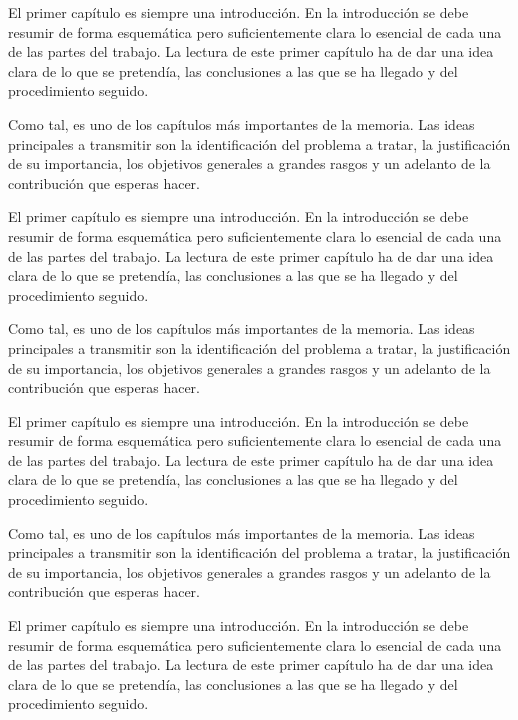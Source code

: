 \documentclass[11pt,a4paper,spanish]{book}
\numberwithin{equation}{chapter}
\numberwithin{figure}{chapter}
\begin{document}
El primer capítulo es siempre una introducción. En la introducción se debe resumir de forma esquemática pero suficientemente clara lo esencial de cada una de las partes del trabajo. La lectura de este primer capítulo ha de dar una idea clara de lo que se pretendía, las conclusiones a las que se ha llegado y del procedimiento seguido.

Como tal, es uno de los capítulos más importantes de la memoria. Las ideas principales a transmitir son la identificación del problema a tratar, la justificación de su importancia, los objetivos generales a grandes rasgos y un adelanto de la contribución que esperas hacer.






El primer capítulo es siempre una introducción. En la introducción se debe resumir de forma esquemática pero suficientemente clara lo esencial de cada una de las partes del trabajo. La lectura de este primer capítulo ha de dar una idea clara de lo que se pretendía, las conclusiones a las que se ha llegado y del procedimiento seguido.

Como tal, es uno de los capítulos más importantes de la memoria. Las ideas principales a transmitir son la identificación del problema a tratar, la justificación de su importancia, los objetivos generales a grandes rasgos y un adelanto de la contribución que esperas hacer.



El primer capítulo es siempre una introducción. En la introducción se debe resumir de forma esquemática pero suficientemente clara lo esencial de cada una de las partes del trabajo. La lectura de este primer capítulo ha de dar una idea clara de lo que se pretendía, las conclusiones a las que se ha llegado y del procedimiento seguido.

Como tal, es uno de los capítulos más importantes de la memoria. Las ideas principales a transmitir son la identificación del problema a tratar, la justificación de su importancia, los objetivos generales a grandes rasgos y un adelanto de la contribución que esperas hacer.



El primer capítulo es siempre una introducción. En la introducción se debe resumir de forma esquemática pero suficientemente clara lo esencial de cada una de las partes del trabajo. La lectura de este primer capítulo ha de dar una idea clara de lo que se pretendía, las conclusiones a las que se ha llegado y del procedimiento seguido.
\end{document}
